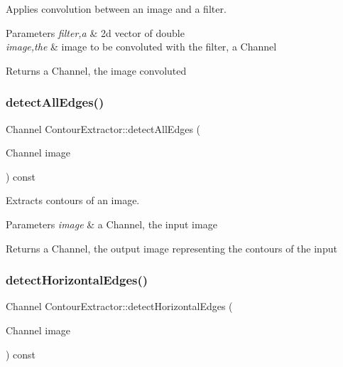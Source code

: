 Applies convolution between an image and a filter. 


\begin{DoxyParams}{Parameters}
{\em filter,a} & 2d vector of double \\
\hline
{\em image,the} & image to be convoluted with the filter, a Channel \\
\hline
\end{DoxyParams}
\begin{DoxyReturn}{Returns}
a Channel, the image convoluted 
\end{DoxyReturn}
\mbox{\label{class_contour_extractor_a0f85a3798530781e5c20b845df1677eb}} 
\subsubsection{\texorpdfstring{detect\+All\+Edges()}{detectAllEdges()}}
{\footnotesize\ttfamily Channel Contour\+Extractor\+::detect\+All\+Edges (\begin{DoxyParamCaption}\item[{Channel}]{image }\end{DoxyParamCaption}) const}



Extracts contours of an image. 


\begin{DoxyParams}{Parameters}
{\em image} & a Channel, the input image \\
\hline
\end{DoxyParams}
\begin{DoxyReturn}{Returns}
a Channel, the output image representing the contours of the input 
\end{DoxyReturn}
\mbox{\label{class_contour_extractor_af99fc045e0745f2b4244ad43822a7a1d}} 
\subsubsection{\texorpdfstring{detect\+Horizontal\+Edges()}{detectHorizontalEdges()}}
{\footnotesize\ttfamily Channel Contour\+Extractor\+::detect\+Horizontal\+Edges (\begin{DoxyParamCaption}\item[{Channel}]{image }\end{DoxyParamCaption}) const}



